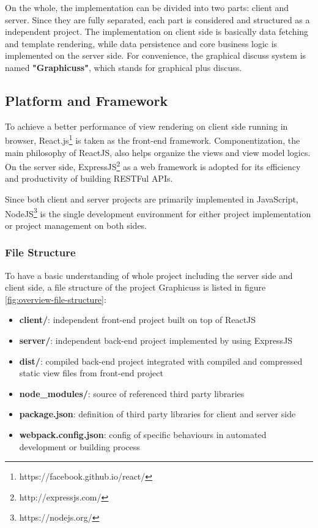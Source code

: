 On the whole, the implementation can be divided into two parts: client and server. Since they are fully separated, each part is considered and structured as a independent project. The implementation on client side is basically data fetching and template rendering, while data persistence and core business logic is implemented on the server side.  For convenience, the graphical discuss system is named \textbf{"Graphicuss"}, which stands for graphical plus discuss.


\subsection{Platform and Framework}
To achieve a better performance of view rendering on client side running in browser, React.js\footnote{https://facebook.github.io/react/} is taken as the front-end framework. Componentization, the main philosophy of ReactJS, also helps organize the views and view model logics. On the server side, ExpressJS\footnote{http://expressjs.com/} as a web framework is adopted for its efficiency and productivity of building RESTFul APIs.

Since both client and server projects are primarily implemented in JavaScript, NodeJS\footnote{https://nodejs.org/} is the single development environment for either project implementation or project management on both sides.

\subsubsection{File Structure}

To have a basic understanding of whole project including the server side and client side, a file structure of the project Graphicuss is listed in figure \ref{fig:overview-file-structure}:

\begin{itemize}
\item 
  \textbf{client/}: independent front-end project built on top of ReactJS
\item
  \textbf{server/}: independent back-end project implemented by using ExpressJS
\item
  \textbf{dist/}: compiled back-end project integrated with compiled and compressed static view files from front-end project
\item 
  \textbf{node\_modules/}: source of referenced third party libraries
\item 
  \textbf{package.json}: definition of third party libraries for client and server side
\item 
  \textbf{webpack.config.json}: config of specific behaviours in automated development or building process
\end{itemize}

